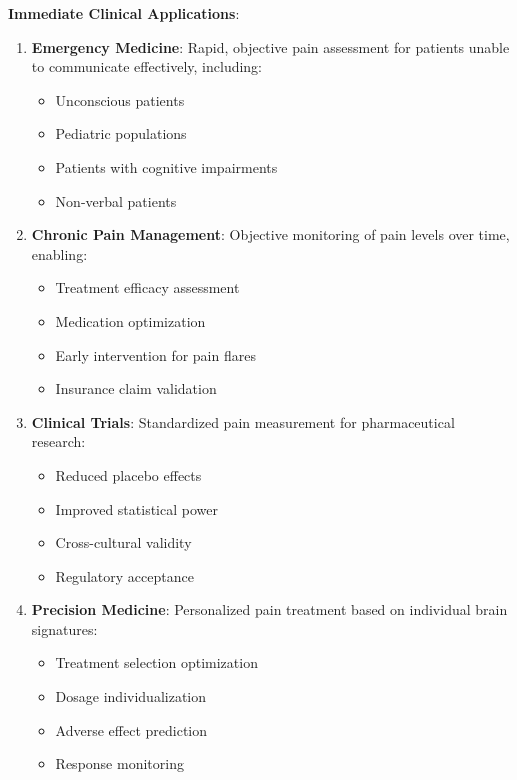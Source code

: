 \textbf{Immediate Clinical Applications}:

\begin{enumerate}
\item \textbf{Emergency Medicine}: Rapid, objective pain assessment for patients unable to communicate effectively, including:
   \begin{itemize}
   \item Unconscious patients
   \item Pediatric populations
   \item Patients with cognitive impairments
   \item Non-verbal patients
   \end{itemize}

\item \textbf{Chronic Pain Management}: Objective monitoring of pain levels over time, enabling:
   \begin{itemize}
   \item Treatment efficacy assessment
   \item Medication optimization
   \item Early intervention for pain flares
   \item Insurance claim validation
   \end{itemize}

\item \textbf{Clinical Trials}: Standardized pain measurement for pharmaceutical research:
   \begin{itemize}
   \item Reduced placebo effects
   \item Improved statistical power
   \item Cross-cultural validity
   \item Regulatory acceptance
   \end{itemize}

\item \textbf{Precision Medicine}: Personalized pain treatment based on individual brain signatures:
   \begin{itemize}
   \item Treatment selection optimization
   \item Dosage individualization
   \item Adverse effect prediction
   \item Response monitoring
   \end{itemize}
\end{enumerate}

